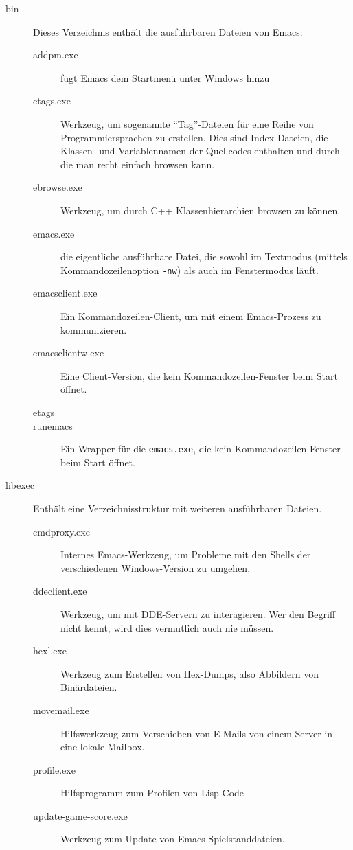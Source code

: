 \documentclass[12pt,ngerman]{scrbook}
\begin{document}
\begin{description}
\item[bin] Dieses Verzeichnis enthält die ausführbaren Dateien von Emacs:

\begin{description}
\item[addpm.exe] fügt Emacs dem Startmenü unter Windows hinzu
\item[ctags.exe] Werkzeug, um sogenannte \enquote{Tag}-Dateien für eine Reihe von Programmiersprachen zu erstellen. Dies sind Index-Dateien, die Klassen- und Variablennamen der Quellcodes enthalten und durch die man recht einfach browsen kann. 
\item[ebrowse.exe] Werkzeug, um durch C++ Klassenhierarchien browsen zu können.
\item[emacs.exe] die eigentliche ausführbare Datei, die sowohl im Textmodus (mittels Kommandozeilenoption \texttt{-nw}) als auch im Fenstermodus läuft. 
\item[emacsclient.exe] Ein Kommandozeilen-Client, um mit einem Emacs-Prozess zu kommunizieren.
\item[emacsclientw.exe] Eine Client-Version, die kein Kommandozeilen-Fenster beim Start öffnet.
\item[etags]
\item[runemacs] Ein Wrapper für die \texttt{emacs.exe}, die kein Kommandozeilen-Fenster beim Start öffnet.
\end{description}


\item[libexec] Enthält eine Verzeichnisstruktur mit weiteren ausführbaren Dateien.

\begin{description}
\item[cmdproxy.exe] Internes Emacs-Werkzeug, um Probleme mit den Shells der verschiedenen Windows-Version zu umgehen.
\item[ddeclient.exe] Werkzeug, um mit DDE-Servern zu interagieren. Wer den Begriff nicht kennt, wird dies vermutlich auch nie müssen.
\item[hexl.exe] Werkzeug zum Erstellen von Hex-Dumps, also Abbildern von Binärdateien.
\item[movemail.exe] Hilfswerkzeug zum Verschieben von E-Mails von einem Server in eine lokale Mailbox.
\item[profile.exe] Hilfsprogramm zum Profilen von Lisp-Code
\item[update-game-score.exe] Werkzeug zum Update von Emacs-Spielstanddateien.
\end{description}


\end{description}
\end{document}
